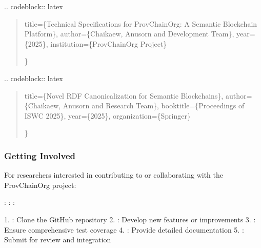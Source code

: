 \documentclass[letterpaper,10pt,english]{sphinxmanual}
\begin{document}
\sphinxAtStartPar
{}
.. code\sphinxhyphen{}block:: latex
\begin{quote}
\begin{description}
\sphinxAtStartPar
title=\{Technical Specifications for ProvChainOrg: A Semantic Blockchain Platform\},
author=\{Chaikaew, Anusorn and Development Team\},
year=\{2025\},
institution=\{ProvChainOrg Project\}

\end{description}

\sphinxAtStartPar
\}
\end{quote}

\sphinxAtStartPar
{}
.. code\sphinxhyphen{}block:: latex
\begin{quote}
\begin{description}
\sphinxAtStartPar
title=\{Novel RDF Canonicalization for Semantic Blockchains\},
author=\{Chaikaew, Anusorn and Research Team\},
booktitle=\{Proceedings of ISWC 2025\},
year=\{2025\},
organization=\{Springer\}

\end{description}

\sphinxAtStartPar
\}
\end{quote}


\subsubsection{Getting Involved}
\label{\detokenize{research/index:getting-involved}}
\sphinxAtStartPar
For researchers interested in contributing to or collaborating with the ProvChainOrg project:

\sphinxAtStartPar
{}
\sphinxhyphen{} : 
\sphinxhyphen{} : 
\sphinxhyphen{} : 

\sphinxAtStartPar
{}
1. : Clone the GitHub repository
2. : Develop new features or improvements
3. : Ensure comprehensive test coverage
4. : Provide detailed documentation
5. : Submit for review and integration
\end{document}
